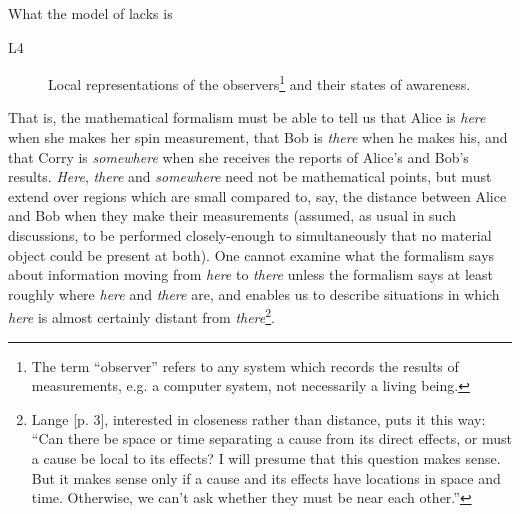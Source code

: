 \documentclass[12pt]{article}
\begin{document}
What the model of \cite{Rubin02} lacks is 
\begin{description}
\item[L4] Local representations of the observers\footnote{The term ``observer'' refers to any system which records the results of
measurements, e.g. a computer system, not necessarily a  living being.} and their states of awareness.
\end{description}
That is, the mathematical formalism must be able to tell us that Alice is {\em here}\/
when she makes her spin measurement, that Bob is {\em there}\/ when he makes his, and
that Corry is {\em somewhere}\/ when she receives the reports of Alice's and Bob's
results. {\em Here}\/, {\em there} and {\em somewhere} need not be mathematical points,
but must extend over regions which are small compared to, say, the distance between Alice
and Bob when they make their measurements (assumed, as usual in such discussions,
to be performed closely-enough to simultaneously that no material object could be present at both). 
One cannot examine what the formalism says about information moving from {\em here}\/ to {\em there}\/
unless the formalism says at least roughly where {\em here}\/ and {\em there}\/ are, and enables
us to describe situations in which {\em here}\/ is almost certainly distant from {\em there}\footnote{
Lange \cite{Lange02}[p. 3], interested in closeness rather than distance, puts it this way: ``Can there
be space or time separating a cause from its direct effects, or must a cause be local to its effects?
I will presume that this question makes sense.  But it makes sense only if a cause and its effects
have locations in space and time.  Otherwise, we can't ask whether they must be near each other.''}.
\end{document}
